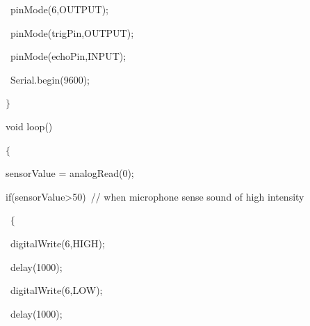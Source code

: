 \documentclass[12pt]{article}
\begin{document}
{\fontsize{14pt}{16.8pt}\selectfont \  pinMode(6,OUTPUT);\par}\par

{\fontsize{14pt}{16.8pt}\selectfont \  pinMode(trigPin,OUTPUT);\par}\par

{\fontsize{14pt}{16.8pt}\selectfont \  pinMode(echoPin,INPUT);\par}\par

{\fontsize{14pt}{16.8pt}\selectfont \  Serial.begin(9600);\par}\par

{\fontsize{14pt}{16.8pt}\selectfont $ \} $ \par}\par

{\fontsize{14pt}{16.8pt}\selectfont void loop() \par}\par

{\fontsize{14pt}{16.8pt}\selectfont $ \{ $ \par}\par

{\fontsize{14pt}{16.8pt}\selectfont  sensorValue = analogRead(0); \par}\par

{\fontsize{14pt}{16.8pt}\selectfont  if(sensorValue>50)\  // when microphone sense sound of high intensity \par}\par

{\fontsize{14pt}{16.8pt}\selectfont \  $ \{ $ \par}\par

{\fontsize{14pt}{16.8pt}\selectfont \  digitalWrite(6,HIGH);\par}\par

{\fontsize{14pt}{16.8pt}\selectfont \  delay(1000);\par}\par

{\fontsize{14pt}{16.8pt}\selectfont \  digitalWrite(6,LOW);\par}\par

{\fontsize{14pt}{16.8pt}\selectfont \  delay(1000);\par}\par
\end{document}
